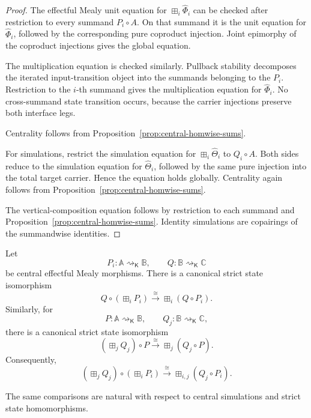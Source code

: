 \begin{proof}
The effectful Mealy unit equation for
\(\boxplus_i\widehat\Phi_i\) can be checked after restriction to every
summand \(P_i\circ A\).  On that summand it is the unit equation for
\(\widehat\Phi_i\), followed by the corresponding pure coproduct injection.
Joint epimorphy of the coproduct injections gives the global equation.

The multiplication equation is checked similarly.  Pullback stability
decomposes the iterated input-transition object into the summands belonging
to the \(P_i\).  Restriction to the \(i\)-th summand gives the multiplication
equation for \(\widehat\Phi_i\).  No cross-summand state transition occurs,
because the carrier injections preserve both interface legs.

Centrality follows from
Proposition~\ref{prop:central-homwise-sums}.

For simulations, restrict the simulation equation for
\(\boxplus_i\widehat\Theta_i\) to \(Q_i\circ A\).  Both sides reduce to the
simulation equation for \(\widehat\Theta_i\), followed by the same pure
injection into the total target carrier.  Hence the equation holds globally.
Centrality again follows from
Proposition~\ref{prop:central-homwise-sums}.

The vertical-composition equation follows by restriction to each summand and
Proposition~\ref{prop:central-homwise-sums}.  Identity simulations are
copairings of the summandwise identities.
\end{proof}

\begin{proposition}
\label{prop:pipeline-distributes-homwise-sums}
Let
\[
    P_i:
    \mathbb A\rightsquigarrow_{\mathsf K}\mathbb B,
    \qquad
    Q:
    \mathbb B\rightsquigarrow_{\mathsf K}\mathbb C
\]
be central effectful Mealy morphisms.  There is a canonical strict state
isomorphism
\[
    Q\circ\left(\boxplus_iP_i\right)
    \xrightarrow{\cong}
    \boxplus_i(Q\circ P_i).
\]
Similarly, for
\[
    P:
    \mathbb A\rightsquigarrow_{\mathsf K}\mathbb B,
    \qquad
    Q_j:
    \mathbb B\rightsquigarrow_{\mathsf K}\mathbb C,
\]
there is a canonical strict state isomorphism
\[
    \left(\boxplus_jQ_j\right)\circ P
    \xrightarrow{\cong}
    \boxplus_j(Q_j\circ P).
\]
Consequently,
\[
    \left(\boxplus_jQ_j\right)
    \circ
    \left(\boxplus_iP_i\right)
    \xrightarrow{\cong}
    \boxplus_{i,j}(Q_j\circ P_i).
\]

The same comparisons are natural with respect to central simulations and
strict state homomorphisms.
\end{proposition}

